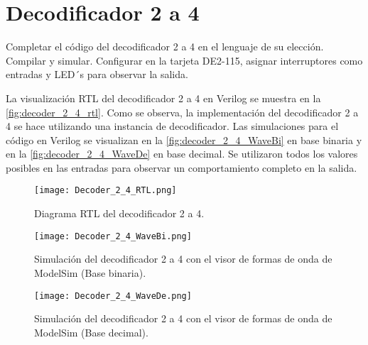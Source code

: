 \section{Decodificador 2 a 4 \label{sec:s3}}

\begin{center}
	\begin{minipage}{12cm}
		\begin{tcolorbox}[title=Actividad 3]
			Completar el código del decodificador 2 a 4 en el lenguaje de su elección. Compilar y simular.  Configurar en la tarjeta DE2-115, asignar interruptores como entradas y LED´s para observar la salida.
		\end{tcolorbox}	
	\end{minipage}
\end{center}

La visualización RTL del decodificador 2 a 4 en Verilog se muestra en la \autoref{fig:decoder_2_4_rtl}. Como se observa, la implementación del decodificador 2 a 4 se hace utilizando una instancia de decodificador. Las simulaciones para el código en Verilog se visualizan en la \autoref{fig:decoder_2_4_WaveBi} en base binaria y en la \autoref{fig:decoder_2_4_WaveDe} en base decimal. Se utilizaron todos los valores posibles en las entradas para observar un comportamiento completo en la salida.

\begin{figure}[ht]
	\centering
	\texttt{[image: Decoder\_2\_4\_RTL.png]}
	\caption{Diagrama RTL del decodificador 2 a 4. \label{fig:decoder_2_4_rtl}}
\end{figure}

\begin{figure}[ht]
	\centering
	\texttt{[image: Decoder\_2\_4\_WaveBi.png]}
	\caption{Simulación del decodificador 2 a 4 con el visor de formas de onda de ModelSim (Base binaria). \label{fig:decoder_2_4_WaveBi}}
\end{figure}

\begin{figure}[ht]
	\centering
	\texttt{[image: Decoder\_2\_4\_WaveDe.png]}
	\caption{Simulación del decodificador 2 a 4 con el visor de formas de onda de ModelSim (Base decimal). \label{fig:decoder_2_4_WaveDe}}
\end{figure}